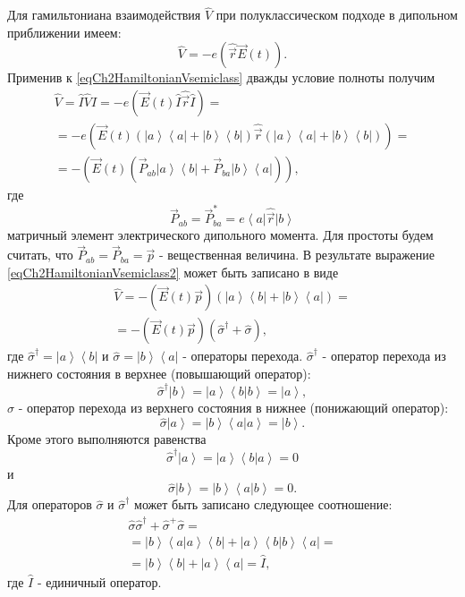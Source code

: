 Для гамильтониана взаимодействия $\hat{V}$ при полуклассическом
подходе в дипольном приближении имеем:
\begin{equation}
\hat{V} = - e \left(\hat{\vec{r}} \vec{E}\left(t\right)\right).
\label{eqCh2HamiltonianVsemiclass}
\end{equation}
Применив к \eqref{eqCh2HamiltonianVsemiclass} дважды условие
полноты получим
\begin{eqnarray}
\hat{V} = \hat{I}\hat{V}\hat{I} = - e \left(\vec{E}\left(t\right)
\hat{I}\hat{\vec{r}}\hat{I}\right) = 
\nonumber \\
= - e \left(\vec{E}\left(t\right) 
\left(\left|a\right>\left<a\right| +
  \left|b\right>\left<b\right|\right)\hat{\vec{r}}
\left(\left|a\right>\left<a\right| +
  \left|b\right>\left<b\right|\right)\right) = 
\nonumber \\
= - \left(\vec{E}\left(t\right)
  \left(\vec{P}_{ab}\left|a\right>\left<b\right| +
    \vec{P}_{ba}\left|b\right>\left<a\right|\right)\right),
\label{eqCh2HamiltonianVsemiclass2}
\end{eqnarray}
где 
\[
\vec{P}_{ab} = \vec{P}_{ba}^{*} = e \left<a\right|\hat{\vec{r}}\left|b\right>
\]
матричный элемент электрического дипольного момента. 
Для простоты будем считать, что $\vec{P}_{ab} = \vec{P}_{ba} =
\vec{p}$ - вещественная величина. В результате выражение
\eqref{eqCh2HamiltonianVsemiclass2} может быть записано в виде
\begin{eqnarray}
\hat{V} 
= - \left(\vec{E}\left(t\right)\vec{p}\right)
\left(
  \left|a\right>\left<b\right| +
  \left|b\right>\left<a\right|\right) = 
\nonumber \\
= - \left(\vec{E}\left(t\right)\vec{p}\right) \left(\hat{\sigma}^{\dag} + \hat{\sigma}\right),
\label{eqCh2HamiltonianVsemiclass3}
\end{eqnarray}
где  $\hat{\sigma}^{\dag} = \left|a\right>\left<b\right|$ и 
$\hat{\sigma} = \left|b\right>\left<a\right|$ 
-  операторы перехода. 
$\hat{\sigma}^{\dag}$ -  оператор перехода из нижнего состояния в верхнее (повышающий
оператор):
\[
\hat{\sigma}^{\dag} \left|b\right> = 
\left|a\right>\left<b\right|\left.b\right> = 
\left|a\right>,
\]
$\hat{\sigma}$
- оператор перехода из верхнего состояния в нижнее
(понижающий оператор):
\[
\hat{\sigma}
\left|a\right> = 
\left|b\right>\left<a\right|\left.a\right> = 
\left|b\right>.
\]
Кроме этого выполняются равенства
\[
\hat{\sigma}^{\dag} \left|a\right> = 
\left|a\right>\left<b\right|\left.a\right> = 
0
\]
и
\[
\hat{\sigma}
\left|b\right> = 
\left|b\right>\left<a\right|\left.b\right> = 
0.
\]
Для операторов $\hat{\sigma}$ и $\hat{\sigma}^{\dag}$ может быть записано
следующее соотношение: 
\begin{eqnarray}
\hat{\sigma}\hat{\sigma}^{\dag} + \hat{\sigma}^{+}\hat{\sigma} =
\nonumber \\
= \left|b\right>\left<a\right|\left.a\right>\left<b\right| + 
 \left|a\right>\left<b\right|\left.b\right>\left<a\right| = 
\nonumber \\
= \left|b\right>\left<b\right| + \left|a\right>\left<a\right| = \hat{I}, 
\label{eqCh2_task1}
\end{eqnarray}
где $\hat{I}$ - единичный оператор.

